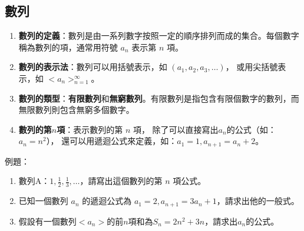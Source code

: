 \documentclass[12pt]{article}
\begin{document}
\begin{tcolorbox}[colframe=black!60!blue, colback=blue!5!white, arc=4pt, boxrule=1pt]
\section{數列}
\begin{enumerate}
    \item \textbf{數列的定義}：數列是由一系列數字按照一定的順序排列而成的集合。每個數字稱為數列的項，通常用符號 $a_n$ 表示第 $n$ 項。
    \item \textbf{數列的表示法}：數列可以用括號表示，如 $(a_1, a_2, a_3, \ldots)$，
    或用尖括號表示，如 $<a_n>_{n=1}^{\infty}$。
    \item \textbf{數列的類型}：\textbf{有限數列}和\textbf{無窮數列}。有限數列是指包含有限個數字的數列，而無限數列則包含無窮多個數字。
    \item \textbf{數列的第$n$項}：表示數列的第 $n$ 項，
    除了可以直接寫出$a_n$的公式（如：$a_n = n^2$），
    還可以用遞迴公式來定義，如：$a_1 = 1, a_{n+1} = a_n + 2$。

\end{enumerate}

\end{tcolorbox}

例題：
\begin{enumerate}
    \item 數列A：$1, \frac{1}{2}, \frac{1}{3}, \ldots$，請寫出這個數列的第 $n$ 項公式。\vspace{2cm}
    \item 已知一個數列 $a_n$ 的遞迴公式為 $a_1 = 2, a_{n+1} = 3a_n + 1$，請求出他的一般式。\vspace{2cm}
    \item 假設有一個數列$<a_n>$的前$n$項和為$S_n = 2n^2 + 3n$，請求出$a_n$的公式。\vspace{2cm}
\end{enumerate}
\newpage
\end{document}
